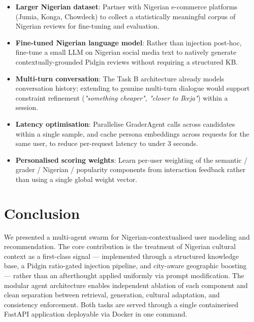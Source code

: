 \documentclass[11pt,a4paper]{article}
\begin{document}
\begin{itemize}[leftmargin=*]
    \item \textbf{Larger Nigerian dataset}: Partner with Nigerian e-commerce platforms (Jumia, Konga, Chowdeck) to collect a statistically meaningful corpus of Nigerian reviews for fine-tuning and evaluation.

    \item \textbf{Fine-tuned Nigerian language model}: Rather than injection post-hoc, fine-tune a small LLM on Nigerian social media text to natively generate contextually-grounded Pidgin reviews without requiring a structured KB.

    \item \textbf{Multi-turn conversation}: The Task B architecture already models conversation history; extending to genuine multi-turn dialogue would support constraint refinement (\textit{"something cheaper", "closer to Ikeja"}) within a session.

    \item \textbf{Latency optimisation}: Parallelise GraderAgent calls across candidates within a single sample, and cache persona embeddings across requests for the same user, to reduce per-request latency to under 3 seconds.

    \item \textbf{Personalised scoring weights}: Learn per-user weighting of the semantic / grader / Nigerian / popularity components from interaction feedback rather than using a single global weight vector.
\end{itemize}

\section{Conclusion}

We presented a multi-agent swarm for Nigerian-contextualised user modeling and recommendation. The core contribution is the treatment of Nigerian cultural context as a first-class signal — implemented through a structured knowledge base, a Pidgin ratio-gated injection pipeline, and city-aware geographic boosting — rather than an afterthought applied uniformly via prompt modification. The modular agent architecture enables independent ablation of each component and clean separation between retrieval, generation, cultural adaptation, and consistency enforcement. Both tasks are served through a single containerised FastAPI application deployable via Docker in one command.

\end{document}
